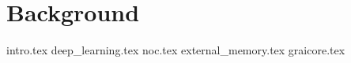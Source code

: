 \chapter{Background}
\label{ch:2}
{intro.tex}
{deep_learning.tex}
{noc.tex}
{external_memory.tex}
{graicore.tex}